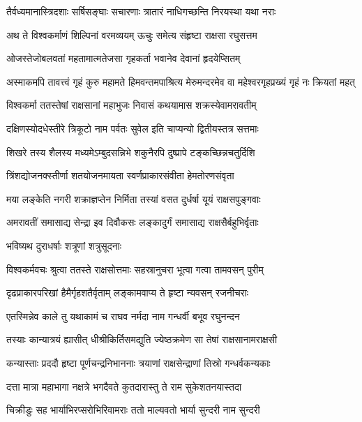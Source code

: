 \twolineshloka
{तैर्वध्यमानास्त्रिदशाः सर्षिसङ्घाः सचारणाः}
{त्रातारं नाधिगच्छन्ति निरयस्था यथा नराः} %

\twolineshloka
{अथ ते विश्वकर्माणं शिल्पिनां वरमव्ययम्}
{ऊचुः समेत्य संहृष्टा राक्षसा रघुसत्तम} %

\twolineshloka
{ओजस्तेजोबलवतां महतामात्मतेजसा}
{गृहकर्ता भवानेव देवानां हृदयेप्सितम्} %

\threelineshloka
{अस्माकमपि तावत्त्वं गृहं कुरु महामते}
{हिमवन्तमपाश्रित्य मेरुमन्दरमेव वा}
{महेश्वरगृहप्रख्यं गृहं नः क्रियतां महत्} %

\twolineshloka
{विश्वकर्मा ततस्तेषां राक्षसानां महाभुजः}
{निवासं कथयामास शक्रस्येवामरावतीम्} %

\twolineshloka
{दक्षिणस्योदधेस्तीरे त्रिकूटो नाम पर्वतः}
{सुवेल इति चाप्यन्यो द्वितीयस्तत्र सत्तमाः} %

\twolineshloka
{शिखरे तस्य शैलस्य मध्यमेऽम्बुदसन्निभे}
{शकुनैरपि दुष्प्रापे टङ्कच्छिन्नचतुर्दिशि} %

\twolineshloka
{त्रिंशद्योजनक्स्तीर्णा शतयोजनमायता}
{स्वर्णप्राकारसंवीता हेमतोरणसंवृता} %

\twolineshloka
{मया लङ्केति नगरी शक्राज्ञप्तेन निर्मिता}
{तस्यां वसत दुर्धर्षा यूयं राक्षसपुङ्गवाः} %

\twolineshloka
{अमरावतीं समासाद्य सेन्द्रा इव दिवौकसः}
{लङ्कादुर्गं समासाद्य राक्षसैर्बहुभिर्वृताः} %

\onelineshloka
{भविष्यथ दुराधर्षाः शत्रूणां शत्रुसूदनाः} %

\twolineshloka
{विश्वकर्मवचः श्रुत्वा ततस्ते राक्षसोत्तमाः}
{सहस्रानुचरा भूत्वा गत्वा तामवसन् पुरीम्} %

\twolineshloka
{दृढप्राकारपरिखां हैमैर्गृहशतैर्वृताम्}
{लङ्कामवाप्य ते हृष्टा न्यवसन् रजनीचराः} %

\twolineshloka
{एतस्मिन्नेव काले तु यथाकामं च राघव}
{नर्मदा नाम गन्धर्वी बभूव रघुनन्दन} %

\twolineshloka
{तस्याः कान्यात्रयं ह्यासीत् धीश्रीकिर्तिसमद्युति}
{ज्येष्ठक्रमेण सा तेषां राक्षसानामराक्षसी} %

\twolineshloka
{कन्यास्ताः प्रददौ हृष्टा पूर्णचन्द्रनिभाननाः}
{त्रयाणां राक्षसेन्द्राणां तिस्रो गन्धर्वकन्यकाः} %

\twolineshloka
{दत्ता मात्रा महाभागा नक्षत्रे भगदैवते}
{कुतदारास्तु ते राम सुकेशतनयास्तदा} %

\twolineshloka
{चिक्रीडुः सह भार्याभिरप्सरोभिरिवामराः}
{ततो माल्यवतो भार्या सुन्दरी नाम सुन्दरी} %

